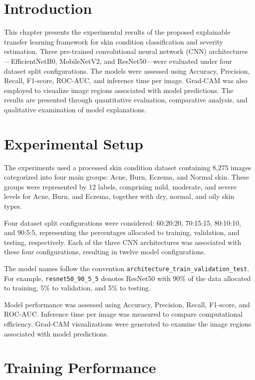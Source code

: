 \section{Introduction}

This chapter presents the experimental results of the proposed explainable transfer learning framework for skin condition classification and severity estimation. Three pre-trained convolutional neural network (CNN) architectures---EfficientNetB0, MobileNetV2, and ResNet50---were evaluated under four dataset split configurations. The models were assessed using Accuracy, Precision, Recall, F1-score, ROC-AUC, and inference time per image. Grad-CAM was also employed to visualize image regions associated with model predictions. The results are presented through quantitative evaluation, comparative analysis, and qualitative examination of model explanations.

\section{Experimental Setup}

The experiments used a processed skin condition dataset containing 8,275 images categorized into four main groups: Acne, Burn, Eczema, and Normal skin. These groups were represented by 12 labels, comprising mild, moderate, and severe levels for Acne, Burn, and Eczema, together with dry, normal, and oily skin types.

Four dataset split configurations were considered: 60:20:20, 70:15:15, 80:10:10, and 90:5:5, representing the percentages allocated to training, validation, and testing, respectively. Each of the three CNN architectures was associated with these four configurations, resulting in twelve model configurations.

The model names follow the convention \texttt{architecture\_train\_validation\_test}. For example, \texttt{resnet50\_90\_5\_5} denotes ResNet50 with 90\% of the data allocated to training, 5\% to validation, and 5\% to testing.

Model performance was assessed using Accuracy, Precision, Recall, F1-score, and ROC-AUC. Inference time per image was measured to compare computational efficiency. Grad-CAM visualizations were generated to examine the image regions associated with model predictions.

\section{Training Performance}

